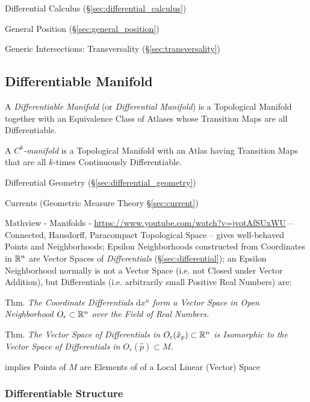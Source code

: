 \fist Differential Calculus (\S\ref{sec:differential_calculus})

General Position (\S\ref{sec:general_position})

Generic Intersections: Transversality (\S\ref{sec:transversality})



\subsection{Differentiable Manifold}\label{sec:differentiable_manifold}

A \emph{Differentiable Manifold} (or \emph{Differential Manifold}) is a
Topological Manifold together with an Equivalence Class of Atlases whose
Transition Maps are all Differentiable.

A \emph{$C^k$-manifold} is a Topological Manifold with an Atlas having
Transition Maps that are all $k$-times Continuously Differentiable.

\fist Differential Geometry (\S\ref{sec:differential_geometry})

Currents (Geometric Measure Theory \S\ref{sec:current})

\asterism

Mathview - Manifolds - \url{https://www.youtube.com/watch?v=jvotAfSUxWU}
--
Connected, Hausdorff, Paracompact Topological Space -- gives well-behaved Points
and Neighborhoods;
Epsilon Neighborhoods constructed from Coordinates in
$\mathbb{R}^n$ are Vector Spaces of \emph{Differentials} (\S\ref{sec:differential});
an Epsilon Neighborhood normally is not a Vector Space (i.e. not Closed under
Vector Addition), but Differentials (i.e. arbitrarily small Positive Real
Numbers) are:

Thm. \emph{The Coordinate Differentials $\mathrm{d}x^n$ form a Vector Space in
  Open Neighborhood $O_\epsilon \subset \mathbb{R}^n$ over the Field of Real
  Numbers.}

Thm. \emph{The Vector Space of Differentials in $O_\epsilon(\hat{x}_p) \subset
  \mathbb{R}^n$ is Isomorphic to the Vector Space of Differentials in
  $O_\epsilon(\hat{p}) \subset M$.}

implies Points of $M$ are Elements of of a Local Linear (Vector) Space



\subsubsection{Differentiable Structure}\label{sec:differentiable_structure}

